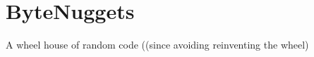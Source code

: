 \chapter{Byte\+Nuggets}
\hypertarget{md__r_e_a_d_m_e}{}\label{md__r_e_a_d_m_e}
\label{md__r_e_a_d_m_e_autotoc_md0}%
%


A wheel house of random code ((since avoiding reinventing the wheel) 